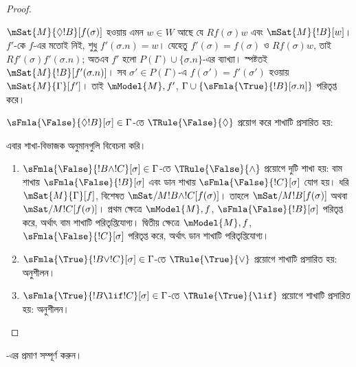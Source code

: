 \documentclass[../../../include/open-logic-section]{subfiles}
\begin{document}
\begin{proof}
\begin{enumerate}
{{  $\mSat{M}{\Diamond !B}[f(\sigma)]$ হওয়ায় এমন $w \in W$ আছে যে
  $Rf(\sigma)w$ এবং $\mSat{M}{!B}[w]$। $f'$-কে $f$-এর মতোই
  নিই, শুধু $f'(\sigma.n) = w$। যেহেতু
  $f'(\sigma) = f(\sigma)$ ও $Rf(\sigma)w$, তাই
  $Rf'(\sigma)f'(\sigma.n)$; অতএব $f'$ হলো
  $P(\Gamma) \cup \{\sigma.n\}$-এর ব্যাখ্যা। স্পষ্টতই
  $\mSat{M}{!B}[f'(\sigma.n)]$। সব
  $\sigma' \in P(\Gamma)$-এ $f(\sigma') = f'(\sigma')$
  হওয়ায় $\mSat{M}{\Gamma}[f']$। তাই $\mModel{M}, f'$,
  $\Gamma \cup \{\sFmla{\True}{!B}[\sigma.n]\}$
  পরিতৃপ্ত করে।}
\item $\sFmla{\False}{\Diamond !B}[\sigma] \in \Gamma$-তে
  $\TRule{\False}{\Diamond}$ প্রয়োগ করে শাখাটি প্রসারিত হয়:
  }{}
\end{enumerate}
এবার শাখা-বিভাজক অনুমানগুলি বিবেচনা করি।
\begin{enumerate}
\item $\sFmla{\False}{!B \land !C}[\sigma] \in \Gamma$-তে
  $\TRule{\False}{\land}$ প্রয়োগে দুটি শাখা হয়: বাম শাখায়
  $\sFmla{\False}{!B}[\sigma]$ এবং ডান শাখায়
  $\sFmla{\False}{!C}[\sigma]$ যোগ হয়। ধরি
  $\mSat{M}{\Gamma}[f]$, বিশেষত
  $\mSat/{M}{!B \land !C}[f(\sigma)]$। তাহলে
  $\mSat/{M}{!B}[f(\sigma)]$ অথবা
  $\mSat/{M}{!C}[f(\sigma)]$। প্রথম ক্ষেত্রে
  $\mModel{M}, f$, $\sFmla{\False}{!B}[\sigma]$
  পরিতৃপ্ত করে, অর্থাৎ বাম শাখাটি পরিতৃপ্তিযোগ্য।
  দ্বিতীয় ক্ষেত্রে $\mModel{M}, f$,
  $\sFmla{\False}{!C}[\sigma]$ পরিতৃপ্ত করে, অর্থাৎ
  ডান শাখাটি পরিতৃপ্তিযোগ্য।
\item $\sFmla{\True}{!B \lor !C}[\sigma] \in \Gamma$-তে
  $\TRule{\True}{\lor}$ প্রয়োগে শাখাটি প্রসারিত হয়:
  অনুশীলন।
\item $\sFmla{\True}{!B \lif !C}[\sigma] \in \Gamma$-তে
  $\TRule{\True}{\lif}$ প্রয়োগে শাখাটি প্রসারিত হয়:
  অনুশীলন।
\end{enumerate}
\end{proof}

\begin{prob}
-এর প্রমাণ সম্পূর্ণ করুন।
\end{prob}
\end{document}

